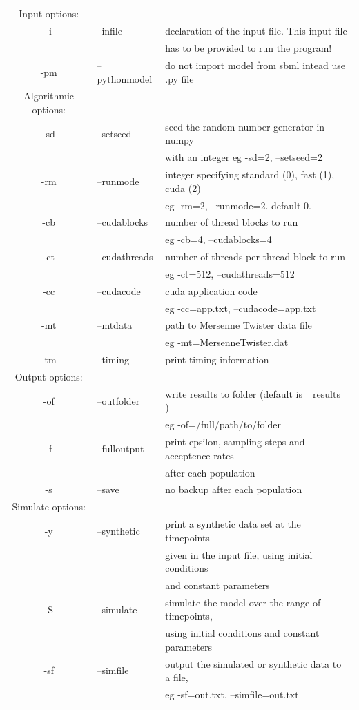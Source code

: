 \documentclass[a4paper]{report}
\begin{document}
\begin{table}[h]
\tt
\begin{center}
\begin{tabular}{c l l}
   Input options: & & \\
-i  &    --infile &  declaration of the input file. This input file \\ && has to be provided to run the program! \\
-pm &    --pythonmodel &   do not import model from sbml intead use .py file \\

Algorithmic options: & & \\
-sd &     --setseed &        seed the random number generator in numpy  \\ & &  with an integer eg -sd=2, --setseed=2 \\
-rm &    --runmode &        integer specifying standard (0), fast (1), cuda (2)  \\ & &  eg -rm=2, --runmode=2. default 0. \\
-cb &    --cudablocks &   number of thread blocks to run  \\ & &  eg -cb=4, --cudablocks=4 \\
-ct  &    --cudathreads &    number of threads per thread block to run  \\ & &  eg -ct=512, --cudathreads=512 \\
-cc &    --cudacode &       cuda application code  \\ & &  eg -cc=app.txt, --cudacode=app.txt \\
-mt &    --mtdata &  path to Mersenne Twister data file  \\ & &  eg -mt=MersenneTwister.dat \\
-tm &    --timing &  print timing information \\

Output options: & & \\
-of &     --outfolder &   write results to folder  (default is \_results\_ ) \\ & &  eg -of=/full/path/to/folder \\
-f &      --fulloutput  &   print epsilon, sampling steps and acceptence rates \\ & & after each population \\
-s &   --save  &         no backup after each population \\

Simulate options: & & \\
-y &      --synthetic &  print a synthetic data set at the timepoints \\ & & given in the input file, using initial conditions \\ & & and constant parameters \\
-S &      --simulate &  simulate the model over the range of timepoints, \\ & & using initial conditions and constant parameters \\
-sf &     --simfile &       output the simulated or synthetic data to a file, \\ & & eg -sf=out.txt, --simfile=out.txt \\


\end{tabular}
\end{center}
\end{table}
\end{document}
